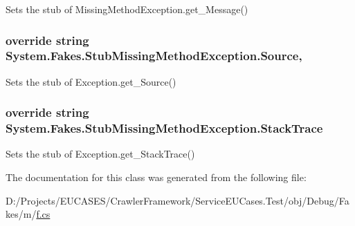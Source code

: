 Sets the stub of Missing\-Method\-Exception.\-get\-\_\-\-Message()

\hypertarget{class_system_1_1_fakes_1_1_stub_missing_method_exception_a8e285963b095d11daa446fc29f036ecb}{
\subsubsection[{Source}]{\setlength{\rightskip}{0pt plus 5cm}override string System.\-Fakes.\-Stub\-Missing\-Method\-Exception.\-Source\hspace{0.3cm}{\ttfamily [get]}, {\ttfamily [set]}}}\label{class_system_1_1_fakes_1_1_stub_missing_method_exception_a8e285963b095d11daa446fc29f036ecb}


Sets the stub of Exception.\-get\-\_\-\-Source()

\hypertarget{class_system_1_1_fakes_1_1_stub_missing_method_exception_ad818e1d70ce851bc55c067e3eb718e4a}{
\subsubsection[{Stack\-Trace}]{\setlength{\rightskip}{0pt plus 5cm}override string System.\-Fakes.\-Stub\-Missing\-Method\-Exception.\-Stack\-Trace\hspace{0.3cm}{\ttfamily [get]}}}\label{class_system_1_1_fakes_1_1_stub_missing_method_exception_ad818e1d70ce851bc55c067e3eb718e4a}


Sets the stub of Exception.\-get\-\_\-\-Stack\-Trace()



The documentation for this class was generated from the following file\-:\begin{DoxyCompactItemize}
\item 
D\-:/\-Projects/\-E\-U\-C\-A\-S\-E\-S/\-Crawler\-Framework/\-Service\-E\-U\-Cases.\-Test/obj/\-Debug/\-Fakes/m/\hyperlink{m_2f_8cs}{f.\-cs}\end{DoxyCompactItemize}
